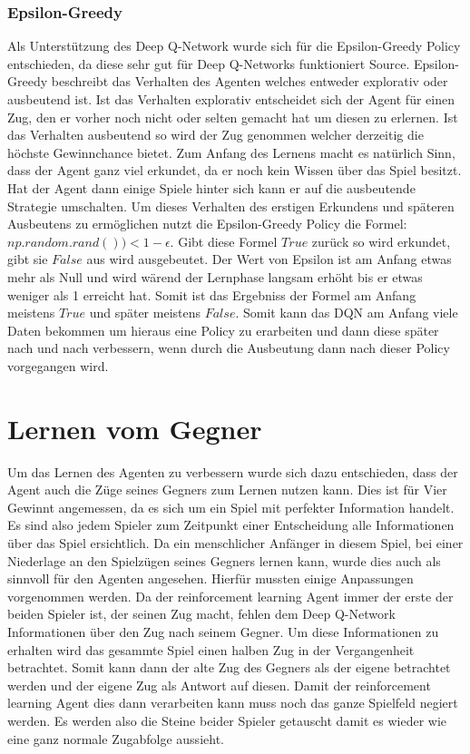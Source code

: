 \subsubsection{Epsilon-Greedy}
Als Unterstützung des Deep Q-Network wurde sich für die Epsilon-Greedy Policy entschieden, da diese sehr gut für Deep Q-Networks funktioniert \colorbox{red!30}{Source}. Epsilon-Greedy beschreibt das Verhalten des Agenten welches entweder explorativ oder ausbeutend ist. Ist das Verhalten explorativ entscheidet sich der Agent für einen Zug, den er vorher noch nicht oder selten gemacht hat um diesen zu erlernen. Ist das Verhalten ausbeutend so wird der Zug genommen welcher derzeitig die höchste Gewinnchance bietet. Zum Anfang des Lernens macht es natürlich Sinn, dass der Agent ganz viel erkundet, da er noch kein Wissen über das Spiel besitzt. Hat der Agent dann einige Spiele hinter sich kann er auf die ausbeutende Strategie umschalten. Um dieses Verhalten des erstigen Erkundens und späteren Ausbeutens zu ermöglichen nutzt die Epsilon-Greedy Policy die Formel: $np.random.rand())<1-\epsilon$. Gibt diese Formel $True$ zurück so wird erkundet, gibt sie $False$ aus wird ausgebeutet. Der Wert von Epsilon ist am Anfang etwas mehr als Null und wird wärend der Lernphase langsam erhöht bis er etwas weniger als 1 erreicht hat. Somit ist das Ergebniss der Formel am Anfang meistens $True$ und später meistens $False$. Somit kann das DQN am Anfang viele Daten bekommen um hieraus eine Policy zu erarbeiten und dann diese später nach und nach verbessern, wenn durch die Ausbeutung dann nach dieser Policy vorgegangen wird.


\section{Lernen vom Gegner}
Um das Lernen des Agenten zu verbessern wurde sich dazu entschieden, dass der Agent auch die Züge seines Gegners zum Lernen nutzen kann. Dies ist für Vier Gewinnt angemessen, da es sich um ein Spiel mit perfekter Information handelt. Es sind also jedem Spieler zum Zeitpunkt einer Entscheidung alle Informationen über das Spiel ersichtlich. Da ein menschlicher Anfänger in diesem Spiel, bei einer Niederlage an den Spielzügen seines Gegners lernen kann, wurde dies auch als sinnvoll für den Agenten angesehen. Hierfür mussten einige Anpassungen vorgenommen werden. Da der reinforcement learning Agent immer der erste der beiden Spieler ist, der seinen Zug macht, fehlen dem Deep Q-Network Informationen über den Zug nach seinem Gegner. 
Um diese Informationen zu erhalten wird das gesammte Spiel einen halben Zug in der Vergangenheit betrachtet. Somit kann dann der alte Zug des Gegners als der eigene betrachtet werden und der eigene Zug als Antwort auf diesen. Damit der reinforcement learning Agent dies dann verarbeiten kann muss noch das ganze Spielfeld negiert werden. Es werden also die Steine beider Spieler getauscht damit es wieder wie eine ganz normale Zugabfolge aussieht. 

